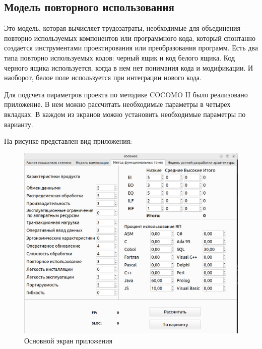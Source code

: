 \subsection*{Модель повторного использования}
Это модель, которая вычисляет трудозатраты, необходимые для объединения повторно используемых компонентов или программного кода, который спонтанно создается инструментами проектирования или преобразования программ. 
Есть два типа повторно используемых кодов: черный ящик и код белого ящика. 
Код черного ящика используется, когда в нем нет понимания кода и модификации. 
И наоборот, белое поле используется при интеграции нового кода. 

Для подсчета параметров проекта по методике COCOMO II было реализовано приложение.
В нем можно рассчитать необходимые параметры в четырех вкладках.
В каждом из экранов можно установить необходимые параметры по варианту.

На рисунке представлен вид приложения:
\FloatBarrier
\begin{figure}[h]	
	\begin{center}
		\includegraphics[width=\linewidth]{inc/res.png}
	\end{center}
	\captionsetup{justification=centering}
	\caption{Основной экран приложения}
\end{figure}
\FloatBarrier 

